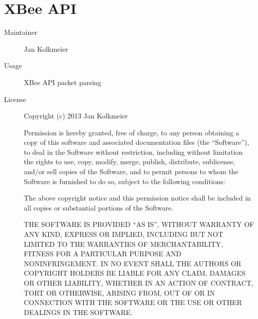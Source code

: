   \section*{XBee API}
    \begin{description}
      \item[Maintainer] Jan Kolkmeier
      \item[Usage] XBee API packet parsing
      \item[License] \scriptsize Copyright (c) 2013 Jan Kolkmeier

      Permission is hereby granted, free of charge, to any person
      obtaining a copy of this software and associated documentation
      files (the ``Software''), to deal in the Software without
      restriction, including without limitation the rights to use,
      copy, modify, merge, publish, distribute, sublicense, and/or sell
      copies of the Software, and to permit persons to whom the
      Software is furnished to do so, subject to the following
      conditions:

      The above copyright notice and this permission notice shall be
      included in all copies or substantial portions of the Software.

      THE SOFTWARE IS PROVIDED ``AS IS'', WITHOUT WARRANTY OF ANY KIND,
      EXPRESS OR IMPLIED, INCLUDING BUT NOT LIMITED TO THE WARRANTIES
      OF MERCHANTABILITY, FITNESS FOR A PARTICULAR PURPOSE AND
      NONINFRINGEMENT. IN NO EVENT SHALL THE AUTHORS OR COPYRIGHT
      HOLDERS BE LIABLE FOR ANY CLAIM, DAMAGES OR OTHER LIABILITY,
      WHETHER IN AN ACTION OF CONTRACT, TORT OR OTHERWISE, ARISING
      FROM, OUT OF OR IN CONNECTION WITH THE SOFTWARE OR THE USE OR
      OTHER DEALINGS IN THE SOFTWARE.
    \end{description}
